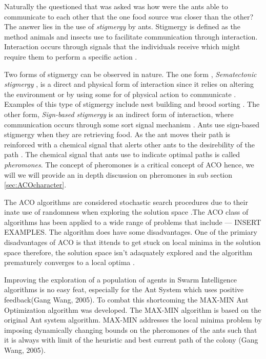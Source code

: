 Naturally the questioned that was asked was how were the ants able to communicate to each other that the one food source was closer than the other? The answer lies in the use of \emph{stigmergy} \label{def:stigmergy} by ants. Stigmergy is defined as the method animals and insects use to facilitate communication through interaction. Interaction occurs through signals that the individuals receive which might require them to perform a specific action \cite{AntsAndStigmergy,CompuIntelligenceIntro,AntIntroTrends}.

Two forms of stigmergy can be observed in nature. The one form , \emph{Sematectonic stigmergy} \label{def:sematectonic}, is a direct and physical form of interaction since it relies on altering the environment or by using some for of physical action to communicate \cite{CompuIntelligenceIntro}. Examples of this type of stigmergy include nest building and brood sorting \cite{CompuIntelligenceIntro}. The other form, \emph{Sign-based stigmergy} is an indirect form of interaction, where communication occurs through some sort signal mechanism \cite{CompuIntelligenceIntro}. Ants use sign-based stigmergy when they are retrieving food. As the ant moves their path is reinforced with a chemical signal that alerts other ants to the desirebility of the path \cite{CompuIntelligenceIntro}. The chemical signal that ants use to indicate optimal paths is called \emph{pheromones}.  The concept of pheromones is a critical concept of ACO hence, we will we will provide an in depth discussion on pheromones in sub section \ref{sec:ACOcharacter}.

The ACO algorithms are considered stochastic search procedures due to their inate use of randomness when exploring the solution space \cite{ACOSurvey,ImpACOComplex}.The ACO class of algorithms has been applied to a wide range of problems that include --- INSERT EXAMPLES. The algorithm does have some disadvantages. One of the primiary disadvantages of ACO is that ittends to get stuck on local minima in the solution space therefore, the solution space isn't adaquately explored and the algorithm prematurely converges to a local optima \cite{ImpACOComplex}.

Improving the exploration of a population of agents in Swarm Intelligence algorithms is no easy feat, especially for the Ant System which uses positive feedback(Gang Wang, 2005). To combat this shortcoming the MAX-MIN Ant Optimization algorithm was developed. The MAX-MIN algorithm is based on the original Ant system algorithm. MAX-MIN addresses the local minima problem by imposing dynamically changing bounds on the pheromones of the ants such that it is always with limit of the heuristic and best current path of the colony (Gang Wang, 2005).

